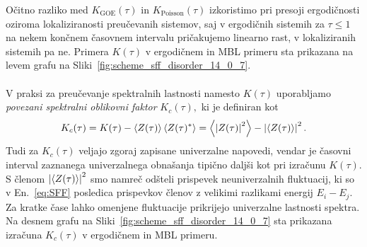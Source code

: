 Očitno razliko med $K_\mathrm{GOE}(\tau)$ in $K_\mathrm{Poisson}(\tau)$ izkoristimo pri presoji ergodičnosti oziroma lokaliziranosti preučevanih sistemov, saj v ergodičnih sistemih za $\tau\leq1$ na nekem končnem časovnem intervalu pričakujemo linearno rast, v lokaliziranih sistemih pa ne. Primera $K(\tau)$ v ergodičnem in MBL primeru sta prikazana na levem grafu na Sliki~\ref{fig:scheme_sff_disorder_14_0_7}.\\\\
V praksi za preučevanje spektralnih lastnosti namesto $K(\tau)$ uporabljamo \emph{povezani spektralni oblikovni faktor} $K_c(\tau),$ ki je definiran kot~\cite{chen2017universal} 
\begin{equation}\label{eq:SFF_connected}
K_c(\tau)=K(\tau) - \left\langle Z(\tau) \right\rangle \left\langle Z(\tau)^*\right\rangle=\left\langle \left| Z(\tau) \right|^2 \right\rangle - \left| \left\langle Z(\tau)\right\rangle \right|^2.
\end{equation}
Tudi za $K_c(\tau)$ veljajo zgoraj zapisane univerzalne napovedi, vendar je časovni interval zaznanega univerzalnega obnašanja tipično daljši kot pri izračunu $K(\tau).$ S členom $\left| \left\langle Z(\tau)\right\rangle \right|^2$ smo namreč odšteli prispevek neuniverzalnih fluktuacij, ki so v En.~\eqref{eq:SFF} posledica prispevkov členov z velikimi razlikami energij $E_i-E_j.$ Za kratke čase lahko omenjene fluktuacije prikrijejo univerzalne lastnosti spektra. Na desnem grafu na Sliki~\ref{fig:scheme_sff_disorder_14_0_7} sta prikazana izračuna $K_c(\tau)$ v ergodičnem in MBL primeru. 
